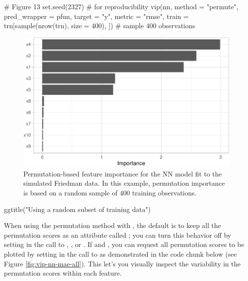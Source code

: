 \begin{Schunk}
\begin{Sinput}
# Figure 13
set.seed(2327)  # for reproducibility
vip(nn, method = "permute", pred_wrapper = pfun, target = "y", metric = "rmse",
    train = trn[sample(nrow(trn), size = 400), ])  # sample 400 observations
\end{Sinput}
\begin{figure}[!htb]

{\centering \includegraphics[width=0.7\linewidth]{greenwell-boehmke_files/figure-latex/vip-permute-nn-sample-1} 

}

\caption[Permutation-based feature importance for the NN model fit to the simulated Friedman data]{Permutation-based feature importance for the NN model fit to the simulated Friedman data. In this example, permutation importance is based on a random sample of 400 training observations.}\label{fig:vip-permute-nn-sample}
\end{figure}
\begin{Sinput}
  ggtitle("Using a random subset of training data")
\end{Sinput}
\end{Schunk}

When using the permutation method with , the default is
to keep all the permutation scores as an attribute called
; you can turn this behavior off by setting
 in the call to , , or
. If  and , you can request
all permutation scores to be plotted by setting
 in the call to  as
demonstrated in the code chunk below (see Figure
\ref{fig:vip-nn-mae-all}). This let's you visually inspect the
variability in the permutation scores within each feature.

